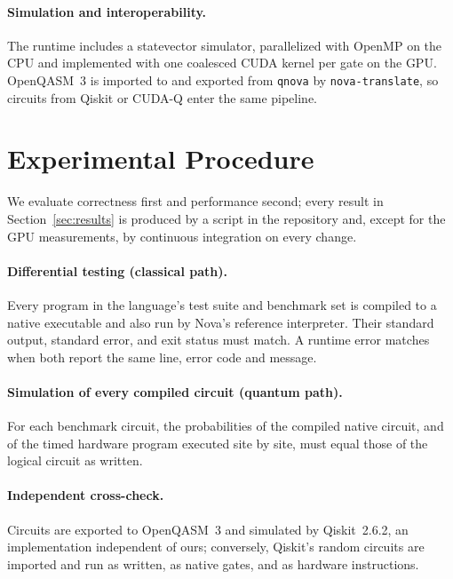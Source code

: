 \documentclass[11pt]{article}
\begin{document}
\paragraph{Simulation and interoperability.} The runtime includes a statevector simulator, parallelized with OpenMP
on the CPU and implemented with one coalesced CUDA kernel per gate on the GPU. OpenQASM~3 is imported to and
exported from \texttt{qnova} by \texttt{nova-translate}, so circuits from Qiskit or CUDA-Q enter the same pipeline.

\section{Experimental Procedure}
\label{sec:method}

We evaluate correctness first and performance second; every result in Section~\ref{sec:results} is produced by a
script in the repository and, except for the GPU measurements, by continuous integration on every change.

\paragraph{Differential testing (classical path).} Every program in the language's test suite and benchmark set is
compiled to a native executable and also run by Nova's reference interpreter. Their standard output, standard
error, and exit status must match. A runtime error matches when both report the same line, error code and message.

\paragraph{Simulation of every compiled circuit (quantum path).} For each benchmark circuit, the probabilities of the
compiled native circuit, and of the timed hardware program executed site by site, must equal those of the logical
circuit as written.

\paragraph{Independent cross-check.} Circuits are exported to OpenQASM~3 and simulated by Qiskit~2.6.2, an
implementation independent of ours; conversely, Qiskit's random circuits are imported and run as written, as
native gates, and as hardware instructions.
\end{document}
